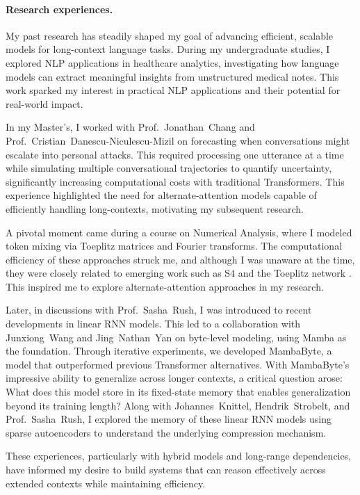 
\paragraph{Research experiences.}
% 
My past research has steadily shaped my goal of advancing efficient, scalable models for long-context language tasks.
% 
During my undergraduate studies, I explored NLP applications in healthcare analytics, investigating how language models can extract meaningful insights from unstructured medical notes.
% 
This work sparked my interest in practical NLP applications and their potential for real-world impact.

In my Master’s, I worked with Prof.~Jonathan~Chang and Prof.~Cristian~Danescu-Niculescu-Mizil on forecasting when conversations might escalate into personal attacks.
% 
This required processing one utterance at a time while simulating multiple conversational trajectories to quantify uncertainty, significantly increasing computational costs with traditional Transformers.
% 
This experience highlighted the need for alternate-attention models capable of efficiently handling long-contexts, motivating my subsequent research.

A pivotal moment came during a course on Numerical Analysis, where I modeled token mixing via Toeplitz matrices and Fourier transforms.
% 
The computational efficiency of these approaches struck me, and although I was unaware at the time, they were closely related to emerging work such as S$4$ \citep{gu_efficiently_2022} and the Toeplitz network \citep{qin_toeplitz_2023}.
% 
This inspired me to explore alternate-attention approaches in my research.

Later, in discussions with Prof.~Sasha~Rush, I was introduced to recent developments in linear RNN models.
% 
This led to a collaboration with Junxiong~Wang and Jing~Nathan~Yan on byte-level modeling, using Mamba as the foundation.
%
Through iterative experiments, we developed MambaByte, a model that outperformed previous Transformer alternatives.
% 
With MambaByte's impressive ability to generalize across longer contexts, a critical question arose:
% 
What does this model store in its fixed-state memory that enables generalization beyond its training length?
% 
Along with Johannes~Knittel, Hendrik~Strobelt, and Prof.~Sasha~Rush, I explored the memory of these linear RNN models using sparse autoencoders to understand the underlying compression mechanism.

These experiences, particularly with hybrid models and long-range dependencies, have informed my desire to build systems that can reason effectively across extended contexts while maintaining efficiency.
